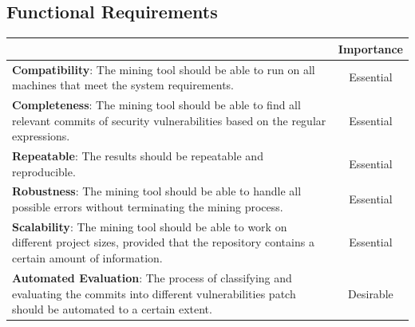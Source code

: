 \documentclass[12pt, a4paper]{report}
\begin{document}
\subsection{Functional Requirements}
\begin{table}[H]
	\begin{center}
		\begin{tabular}{|p{10.3cm}|c|}
			\hline
			\rowcolor[HTML]{D8D8D8}
			\multicolumn{1}{|c|}{Criteria} & Importance \\ \hline
			\textbf{Compatibility}: The mining tool should be able to run on all machines that meet the
			system requirements. & Essential \\ \hline
			\textbf{Completeness}: The mining tool should be able to find all relevant commits of security
			vulnerabilities based on the regular expressions. & Essential \\ \hline
			\textbf{Repeatable}: The results should be repeatable and reproducible. & Essential \\ \hline
			\textbf{Robustness}: The mining tool should be able to handle all possible errors without
			terminating the mining process. & Essential \\ \hline
			\textbf{Scalability}: The mining tool should be able to work on different project sizes,
			provided that the repository contains a certain amount of information. & Essential \\ \hline
			\textbf{Automated Evaluation}: The process of classifying and evaluating the commits into
			different vulnerabilities patch should be automated to a certain extent. & Desirable \\ \hline
			\end{tabular}
		 \label{table:func_req}
	\end{center}
\end{table}
\end{document}
